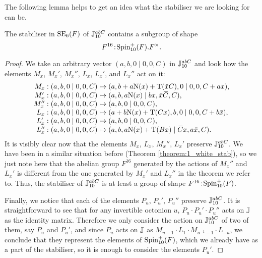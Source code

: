 The following lemma helps to get an idea what the stabiliser
we are looking for can be. 

\begin{lemma}
	\label{lemma:1_white_space_stab}
	The stabiliser in $\mathrm{SE}_6(F)$ of $\mathbb{J}_{10}^{abC}$ contains
	a subgroup of shape 
	\begin{equation}
		F^{16}\mathord{{\;\!{:}\;\!}}\mathrm{Spin}_{10}^+(F).F^{\times}.
	\end{equation}
\end{lemma}

\begin{proof}
	We take an arbitrary vector $(a,b,0 \mid 0,0,C)$ in 
	$\mathbb{J}_{10}^{abC}$ and look how the elements $M_x$, $M_x'$,
	$M_x''$, $L_x$, $L_x'$, and $L_x''$ act on it:
	\begin{equation*}
		\begin{array}{r@{\;}c@{\;}l}
			M_x: (a,b,0\mid 0,0,C) & \mapsto & 
				(a, b + a\NN(x) + \Tr(\ovx C), 0 \mid
					0,0, C + a x), \\
			
			M_x': (a,b,0\mid 0,0,C) & \mapsto & 
				(a, b, a \NN(x) \mid b x, \ovx \ovC, C), \\
				
			M_x'': (a,b,0 \mid 0,0,C) & \mapsto & 
				(a, b, 0 \mid 0, 0, C), \\
				
			L_x: (a,b,0 \mid 0,0,C) & \mapsto & 
				(a + b\NN(x) + \Tr(Cx), b, 0 \mid
					0, 0, C + b\ovx), \\
					
			L_x': (a,b,0 \mid 0,0,C) & \mapsto & 
				(a, b, 0 \mid 0,0,C), \\
				
			L_x'': (a,b,0 \mid 0,0,C) & \mapsto & 
				(a, b, a\NN(x) + \Tr(B x) \mid
					\ovC x, a\ovx, C).
		\end{array}
	\end{equation*}
	It is visibly clear now that the elements $M_x$, $L_x$,
	$M_x''$, $L_x'$ preserve $\mathbb{J}_{10}^{abC}$. We have been in 
	a similar situation before 
	(Theorem \ref{theorem:1_white_stab}), so we just note here
	that the abelian group $F^{16}$ generated by the actions of
	$M_x''$ and $L_x'$ is different from the one generated by
	$M_x'$ and $L_x''$ in the theorem we refer to. Thus, 
	the stabiliser of $\mathbb{J}_{10}^{abC}$ is at least a group of
	shape $F^{16}\mathord{{\;\!{:}\;\!}}\mathrm{Spin}_{10}^+(F)$. 
	
	Finally, we notice that each of the elements $P_u$, $P_u'$,
	$P_u''$ preserve $\mathbb{J}_{10}^{abC}$. It is straightforward to see
	that for any invertible octonion $u$, $P_u \cdot P_u' \cdot
	P_u''$ acts on $\mathbb{J}$ as the identity matrix. Therefore we only
	consider the action on $\mathbb{J}_{10}^{abC}$ of two of them, say
	$P_u$ and $P_u'$, and since $P_u$ acts on $\mathbb{J}$ as
	$M_{u-1} \cdot L_1 \cdot M_{u^{-1}-1} \cdot L_{-u}$, 
	we conclude that they represent the elements of 
	$\mathrm{Spin}_{10}^+(F)$, which we already have as a part of the 
	stabiliser, so it is enough to consider the elements $P_u'$.
	

\end{proof}
